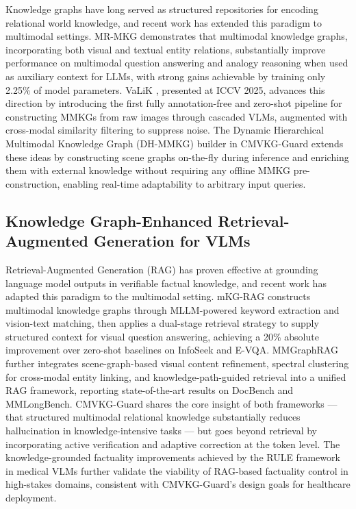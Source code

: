 Knowledge graphs have long served as structured repositories for encoding relational world knowledge, and recent work has extended this paradigm to multimodal settings. MR-MKG \citep{lee2024multimodal} demonstrates that multimodal knowledge graphs, incorporating both visual and textual entity relations, substantially improve performance on multimodal question answering and analogy reasoning when used as auxiliary context for LLMs, with strong gains achievable by training only 2.25\% of model parameters. VaLiK \citep{liu2025aligning}, presented at ICCV 2025, advances this direction by introducing the first fully annotation-free and zero-shot pipeline for constructing MMKGs from raw images through cascaded VLMs, augmented with cross-modal similarity filtering to suppress noise. The Dynamic Hierarchical Multimodal Knowledge Graph (DH-MMKG) builder in CMVKG-Guard extends these ideas by constructing scene graphs on-the-fly during inference and enriching them with external knowledge without requiring any offline MMKG pre-construction, enabling real-time adaptability to arbitrary input queries.

\subsection{Knowledge Graph-Enhanced Retrieval-Augmented Generation for VLMs}

Retrieval-Augmented Generation (RAG) has proven effective at grounding language model outputs in verifiable factual knowledge, and recent work has adapted this paradigm to the multimodal setting. mKG-RAG \citep{wang2024mkgrag} constructs multimodal knowledge graphs through MLLM-powered keyword extraction and vision-text matching, then applies a dual-stage retrieval strategy to supply structured context for visual question answering, achieving a 20\% absolute improvement over zero-shot baselines on InfoSeek and E-VQA. MMGraphRAG \citep{wan2025mmgraphrag} further integrates scene-graph-based visual content refinement, spectral clustering for cross-modal entity linking, and knowledge-path-guided retrieval into a unified RAG framework, reporting state-of-the-art results on DocBench and MMLongBench. CMVKG-Guard shares the core insight of both frameworks --- that structured multimodal relational knowledge substantially reduces hallucination in knowledge-intensive tasks --- but goes beyond retrieval by incorporating active verification and adaptive correction at the token level. The knowledge-grounded factuality improvements achieved by the RULE framework \citep{xia2024rule} in medical VLMs further validate the viability of RAG-based factuality control in high-stakes domains, consistent with CMVKG-Guard's design goals for healthcare deployment.

